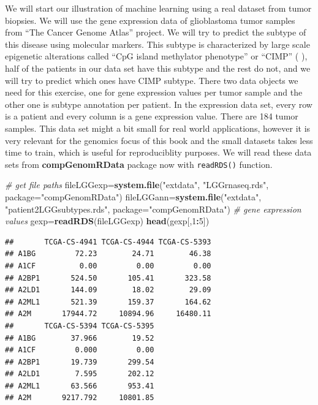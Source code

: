 \documentclass[12pt,]{krantz}
\newenvironment{Shaded}{\begin{snugshade}}{\end{snugshade}}
\newcommand{\CommentTok}[1]{\textcolor[rgb]{0.56,0.35,0.01}{\textit{#1}}}
\newcommand{\DataTypeTok}[1]{\textcolor[rgb]{0.13,0.29,0.53}{#1}}
\newcommand{\DecValTok}[1]{\textcolor[rgb]{0.00,0.00,0.81}{#1}}
\newcommand{\KeywordTok}[1]{\textcolor[rgb]{0.13,0.29,0.53}{\textbf{#1}}}
\newcommand{\NormalTok}[1]{#1}
\newcommand{\OperatorTok}[1]{\textcolor[rgb]{0.81,0.36,0.00}{\textbf{#1}}}
\newcommand{\StringTok}[1]{\textcolor[rgb]{0.31,0.60,0.02}{#1}}
\begin{document}
We will start our illustration of machine learning using a real dataset from tumor biopsies. We will use the gene expression data of glioblastoma tumor samples from ``The Cancer Genome Atlas'' project. We will try to predict the subtype of this disease using molecular markers. This subtype is characterized by large scale epigenetic alterations called ``CpG island methylator phenotype'' or ``CIMP'' ( \citet{pmid20399149}), half of the patients in our data set have this subtype and the rest do not, and we will try to predict which ones have CIMP subtype. There two data objects we need for this exercise, one for gene expression values per tumor sample and the other one is subtype annotation per patient. In the expression data set, every row is a patient and every column is a gene expression value. There are 184 tumor samples. This data set might a bit small for real world applications, however it is very relevant for the genomics focus of this book and the small datasets takes less time to train, which is useful for reproduciblity purposes. We will read these data sets from \textbf{compGenomRData} package now with \texttt{readRDS()} function.

\begin{Shaded}
\begin{Highlighting}[]
\CommentTok{# get file paths}
\NormalTok{fileLGGexp=}\KeywordTok{system.file}\NormalTok{(}\StringTok{"extdata"}\NormalTok{,}
                      \StringTok{"LGGrnaseq.rds"}\NormalTok{,}
                      \DataTypeTok{package=}\StringTok{"compGenomRData"}\NormalTok{)}
\NormalTok{fileLGGann=}\KeywordTok{system.file}\NormalTok{(}\StringTok{"extdata"}\NormalTok{,}
                      \StringTok{"patient2LGGsubtypes.rds"}\NormalTok{,}
                      \DataTypeTok{package=}\StringTok{"compGenomRData"}\NormalTok{)}
\CommentTok{# gene expression values}
\NormalTok{gexp=}\KeywordTok{readRDS}\NormalTok{(fileLGGexp)}
\KeywordTok{head}\NormalTok{(gexp[,}\DecValTok{1}\OperatorTok{:}\DecValTok{5}\NormalTok{])}
\end{Highlighting}
\end{Shaded}

\begin{verbatim}
##       TCGA-CS-4941 TCGA-CS-4944 TCGA-CS-5393
## A1BG         72.23        24.71        46.38
## A1CF          0.00         0.00         0.00
## A2BP1       524.50       105.41       323.58
## A2LD1       144.09        18.02        29.09
## A2ML1       521.39       159.37       164.62
## A2M       17944.72     10894.96     16480.11
##       TCGA-CS-5394 TCGA-CS-5395
## A1BG        37.966        19.52
## A1CF         0.000         0.00
## A2BP1       19.739       299.54
## A2LD1        7.595       202.12
## A2ML1       63.566       953.41
## A2M       9217.792     10801.85
\end{verbatim}
\end{document}
